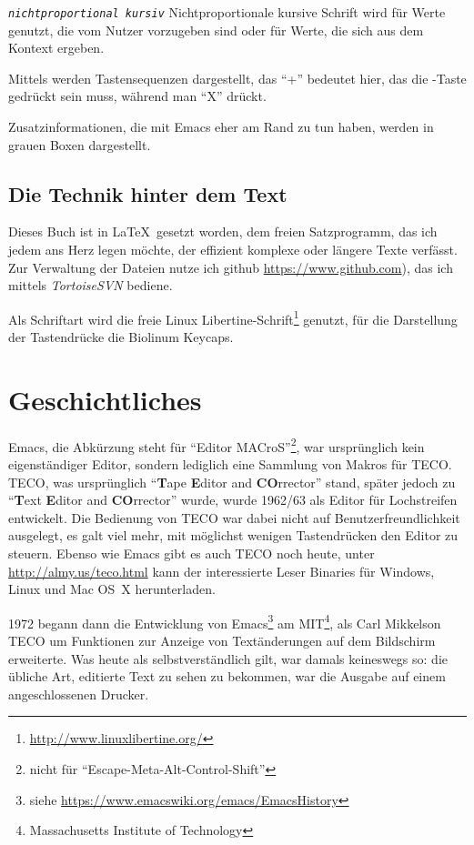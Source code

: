 \documentclass[12pt,ngerman]{scrbook}
\begin{document}
\texttt{\textit{nichtproportional kursiv}} Nichtproportionale kursive Schrift wird für Werte genutzt, die vom Nutzer vorzugeben sind oder für Werte, die sich aus dem Kontext ergeben.

Mittels   werden Tastensequenzen dargestellt, das \enquote{+} bedeutet hier, das die \LKeyStrg-Taste gedrückt sein muss, während man \enquote{X} drückt.

Zusatzinformationen, die mit Emacs eher am Rand zu tun haben, werden in grauen Boxen dargestellt.

\section*{Die Technik hinter dem Text}

Dieses Buch ist in \LaTeX\ gesetzt worden, dem freien Satzprogramm, das ich jedem ans Herz legen möchte, der effizient komplexe oder längere Texte verfässt. Zur Verwaltung der Dateien nutze ich github \url{https://www.github.com}), das ich mittels \textit{TortoiseSVN} bediene. 

Als Schriftart wird die freie Linux Libertine-Schrift\footnote{\url{http://www.linuxlibertine.org/}} genutzt, für die Darstellung der Tastendrücke die Biolinum Keycaps.



\mainmatter

\chapter{Geschichtliches}

Emacs, die Abkürzung steht für \enquote{Editor MACroS}\footnote{nicht für \enquote{Escape-Meta-Alt-Control-Shift}}, war ursprünglich kein eigenständiger Editor, sondern lediglich eine Sammlung von Makros für TECO. 
TECO, was ursprünglich \enquote{\textbf{T}ape \textbf{E}ditor and \textbf{CO}rrector} stand, später jedoch zu \enquote{\textbf{T}ext \textbf{E}ditor and \textbf{CO}rrector} wurde, wurde 1962/63 als Editor für Lochstreifen entwickelt. 
Die Bedienung von TECO war dabei nicht auf Benutzerfreundlichkeit ausgelegt, es galt viel mehr, mit möglichst wenigen Tastendrücken den Editor zu steuern. 
Ebenso wie Emacs gibt es auch TECO noch heute, unter \url{http://almy.us/teco.html} kann der interessierte Leser Binaries für Windows, Linux und Mac OS~X herunterladen. 

1972 begann dann die Entwicklung von Emacs\footnote{siehe \url{https://www.emacswiki.org/emacs/EmacsHistory}} am MIT\footnote{Massachusetts Institute of Technology}, als Carl Mikkelson TECO um Funktionen zur Anzeige von Textänderungen auf dem Bildschirm erweiterte. 
Was heute als selbstverständlich gilt, war damals keineswegs so: die übliche Art, editierte Text zu sehen zu bekommen, war die Ausgabe auf einem angeschlossenen Drucker.
\end{document}
